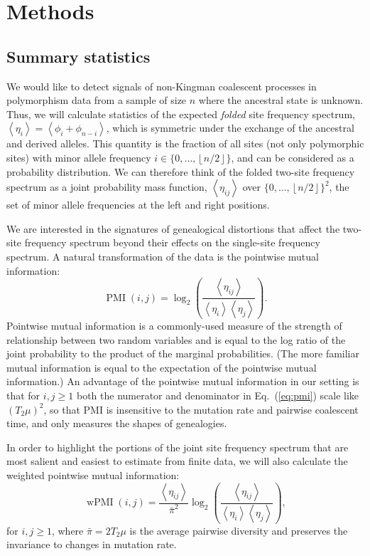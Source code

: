 \documentclass[11pt, letterpaper]{article}   	%
\newcommand{\eq}[1]{Eq.~(\ref{#1})}
\newcommand{\E}[1]{\left<{#1}\right>}
\DeclareMathOperator{\pmi}{PMI}
\DeclareMathOperator{\wpmi}{wPMI}
\begin{document}
\section{Methods}

\subsection{Summary statistics}

We would like to detect signals of non-Kingman coalescent processes in polymorphism data from a sample of size $n$ where the ancestral state is unknown.
Thus, we will calculate statistics of the expected \textit{folded} site frequency spectrum, $\E{\eta_i }= \E{\phi_i + \phi_{n-i}}$, which is symmetric under the exchange of the ancestral and derived alleles.
This quantity is the fraction of all sites (not only polymorphic sites) with minor allele frequency $i \in \{0, \ldots, \left \lfloor{n/2}\right \rfloor  \}$, and can be considered as a probability distribution.
We can therefore think of the folded two-site frequency spectrum as a joint probability mass function, $\E{\eta_{ij}}$ over  $\{0, \ldots, \left \lfloor{n/2}\right \rfloor  \}^2$, the set of minor allele frequencies at the left and right positions.

We are interested in the signatures of genealogical distortions that affect the two-site frequency spectrum beyond their effects on the single-site frequency spectrum.
A natural transformation of the data is the pointwise mutual information:
\begin{equation}
\pmi(i,j) = \log_2 \left( \frac{\E{\eta_{ij}}}{\E{\eta_i} \E{\eta_j}} \right).
\label{eq:pmi}
\end{equation}
Pointwise mutual information is a commonly-used measure of the strength of relationship between two random variables and is equal to the log ratio of the joint probability to the product of the marginal probabilities.
(The more familiar mutual information is equal to the expectation of the pointwise mutual information.)
An advantage of the pointwise mutual information in our setting is that for $i,j \geq 1$ both the numerator and denominator in \eq{eq:pmi} scale like $(T_2 \mu)^2$, so that PMI is insensitive to the mutation rate and pairwise coalescent time, and only measures the shapes of genealogies.

In order to highlight the portions of the joint site frequency spectrum that are most salient and easiest to estimate from finite data, we will also calculate the weighted pointwise mutual information:
\begin{equation}
\wpmi(i,j) = \frac{\E{\eta_{ij}}}{\bar{\pi}^2} \log_2 \left( \frac{\E{\eta_{ij}}}{\E{\eta_i} \E{\eta_j}} \right),
\label{eq:pmi}
\end{equation}
for $i, j \geq 1$, where $\bar{\pi} = 2T_2 \mu$ is the average pairwise diversity and preserves the invariance to changes in mutation rate.
\end{document}
